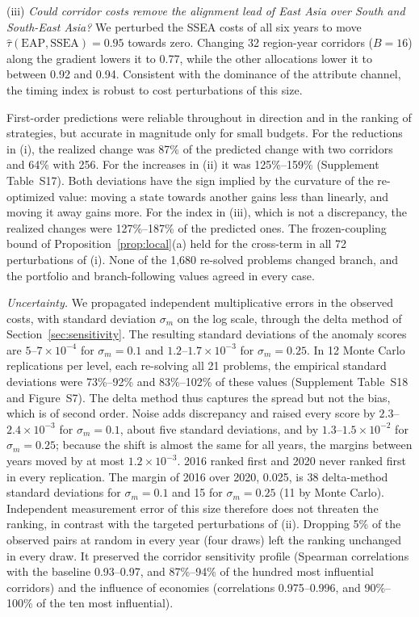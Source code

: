 \documentclass[12pt]{article}
\theoremstyle{definition}
\begin{document}
(iii) \emph{Could corridor costs remove the alignment lead of East Asia over South and South-East Asia?} We perturbed the SSEA costs of all six years to move $\hat\tau(\mathrm{EAP},\mathrm{SSEA})=0.95$ towards zero. Changing 32 region-year corridors ($B=16$) along the gradient lowers it to 0.77, while the other allocations lower it to between 0.92 and 0.94. Consistent with the dominance of the attribute channel, the timing index is robust to cost perturbations of this size.

First-order predictions were reliable throughout in direction and in the ranking of strategies, but accurate in magnitude only for small budgets. For the reductions in (i), the realized change was 87\% of the predicted change with two corridors and 64\% with 256. For the increases in (ii) it was 125\%--159\% (Supplement Table~S17). Both deviations have the sign implied by the curvature of the re-optimized value: moving a state towards another gains less than linearly, and moving it away gains more. For the index in (iii), which is not a discrepancy, the realized changes were 127\%--187\% of the predicted ones. The frozen-coupling bound of Proposition~\ref{prop:local}(a) held for the cross-term in all 72 perturbations of (i). None of the 1{,}680 re-solved problems changed branch, and the portfolio and branch-following values agreed in every case.

\emph{Uncertainty.} We propagated independent multiplicative errors in the observed costs, with standard deviation $\sigma_m$ on the log scale, through the delta method of Section~\ref{sec:sensitivity}. The resulting standard deviations of the anomaly scores are $5$--$7\times10^{-4}$ for $\sigma_m=0.1$ and $1.2$--$1.7\times10^{-3}$ for $\sigma_m=0.25$. In 12 Monte Carlo replications per level, each re-solving all 21 problems, the empirical standard deviations were 73\%--92\% and 83\%--102\% of these values (Supplement Table~S18 and Figure~S7). The delta method thus captures the spread but not the bias, which is of second order. Noise adds discrepancy and raised every score by $2.3$--$2.4\times10^{-3}$ for $\sigma_m=0.1$, about five standard deviations, and by $1.3$--$1.5\times10^{-2}$ for $\sigma_m=0.25$; because the shift is almost the same for all years, the margins between years moved by at most $1.2\times10^{-3}$. 2016 ranked first and 2020 never ranked first in every replication. The margin of 2016 over 2020, 0.025, is 38 delta-method standard deviations for $\sigma_m=0.1$ and 15 for $\sigma_m=0.25$ (11 by Monte Carlo). Independent measurement error of this size therefore does not threaten the ranking, in contrast with the targeted perturbations of (ii). Dropping 5\% of the observed pairs at random in every year (four draws) left the ranking unchanged in every draw. It preserved the corridor sensitivity profile (Spearman correlations with the baseline 0.93--0.97, and 87\%--94\% of the hundred most influential corridors) and the influence of economies (correlations 0.975--0.996, and 90\%--100\% of the ten most influential).
\end{document}
